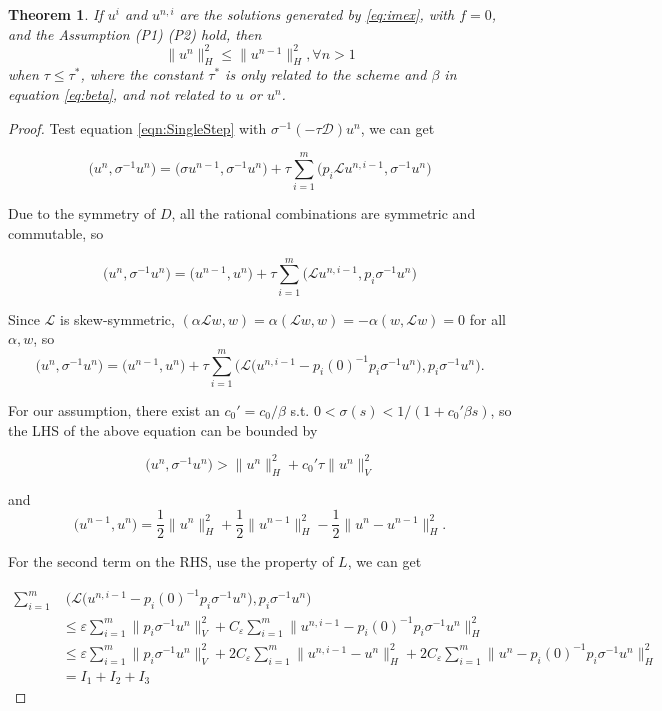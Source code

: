 \documentclass[a4paper, oneside]{book}
\def\epsilon{\varepsilon}
\def\calD{{\mathcal{D}}}
\def\calL{{\mathcal{L}}}
\newtheorem{theorem}{Theorem}[section]
\begin{document}
\begin{theorem}\label{thm:Stable}
    If $u^i$ and $u^{n,i}$ are the solutions generated by \ref{eq:imex},
    with $f=0$, and the Assumption (P1) (P2) hold,
    then
    $$\|u^n\|_H^2  \leq \|u^{n-1}\|_H^2 , \forall n>1$$
    when $\tau \leq \tau^*$, 
    where the constant $\tau^*$ is only 
    related to the scheme and $\beta$ in equation \eqref{eq:beta}, 
    and not related to $u$ or $u^n$.
\end{theorem}
\begin{proof} 
Test equation \ref{eqn:SingleStep} with $\sigma^{-1}(-\tau \calD)u^n$, we can get

$$\big(u^n, \sigma^{-1}u^n\big) = \big(\sigma u^{n-1}, \sigma^{-1}u^n\big) +\tau \sum_{i=1}^m \big(p_i\calL u^{n,i-1}, \sigma^{-1}u^n\big)$$

Due to the symmetry of $D$, all the rational combinations are symmetric and commutable, so 

$$\big(u^n, \sigma^{-1}u^n\big) = \big( u^{n-1}, u^n\big) +\tau \sum_{i=1}^m  \big(\calL u^{n,i-1},p_i \sigma^{-1}u^n\big)$$

Since $\calL$ is skew-symmetric, $(\alpha \calL w,w) = \alpha(\calL w, w)=-\alpha(w, \calL w) = 0$ for all $\alpha, w$,
so
$$\big(u^n, \sigma^{-1}u^n\big)  = \big( u^{n-1}, u^n\big) +
\tau \sum_{i=1}^m  \bigg(\calL\big(u^{n,i-1}-p_i(0)^{-1}p_i \sigma^{-1}u^n\big),p_i \sigma^{-1}u^n\bigg).$$

For our assumption, there exist an $c_0' = c_0 /\beta$ s.t. $0 < \sigma(s) <1/(1+c_0'\beta s)$, so the LHS
of the above equation can be bounded by

$$\big(u^n, \sigma^{-1}u^n\big) > \big\|u^n\big\|_H^2 + c_0'\tau\big\|u^n\big\|_V^2$$

and
$$\big(u^{n-1}, u^n\big) = \frac12\big\|u^n\big\|_H^2+\frac12\big\|u^{n-1}\big\|_H^2-\frac12\big\|u^n-u^{n-1}\big\|_H^2.$$

For the second term on the RHS, use the property of $L$, we can get

\begin{align*}
\sum_{i=1}^m & \;\bigg(\calL\big(u^{n,i-1}-p_i(0)^{-1}p_i \sigma^{-1}u^n\big),p_i \sigma^{-1}u^n\bigg)\\
&\leq \epsilon \sum_{i=1}^m\big\|p_i \sigma^{-1}u^n\big\|_V^2
+ C_\epsilon \sum_{i=1}^m\big\|u^{n,i-1}-p_i(0)^{-1}p_i \sigma^{-1}u^n\big\|_H^2\\
&\leq \epsilon \sum_{i=1}^m\big\|p_i \sigma^{-1}u^n\big\|_V^2
+ 2C_\epsilon \sum_{i=1}^m\big\|u^{n,i-1}-u^n\big\|_H^2 +2C_\epsilon \sum_{i=1}^m\big\|u^n-p_i(0)^{-1}p_i \sigma^{-1}u^n\big\|_H^2\\
&=I_1+I_2+I_3
\end{align*}


\end{proof}
\end{document}
